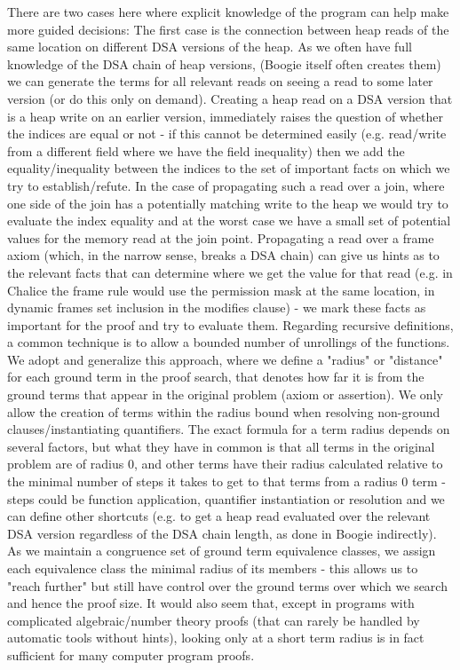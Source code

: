 		There are two cases here where explicit knowledge of the program can help make more guided decisions:
		The first case is the connection between heap reads of the same location on different DSA versions of the heap.
		As we often have full knowledge of the DSA chain of heap versions, (Boogie itself often creates them) we can generate the terms for all relevant reads on seeing a read to some later version (or do this only on demand).
		Creating a heap read on a DSA version that is a heap write on an earlier version, immediately raises the question of whether the indices are equal or not - if this cannot be determined easily (e.g. read/write from a different field where we have the field inequality) then we add the equality/inequality between the indices to the set of important facts on which we try to establish/refute.
		In the case of propagating such a read over a join, where one side of the join has a potentially matching write to the heap we would try to evaluate the index equality and at the worst case we have a small set of potential values for the memory read at the join point.
		Propagating a read over a frame axiom (which, in the narrow sense, breaks a DSA chain) can give us hints as to the relevant facts that can determine where we get the value for that read (e.g. in Chalice the frame rule would use the permission mask at the same location, in dynamic frames set inclusion in the modifies clause) - we mark these facts as important for the proof and try to evaluate them.
		Regarding recursive definitions, a common technique is to allow a bounded number of unrollings of the functions.
		We adopt and generalize this approach, where we define a "radius" or "distance" for each ground term in the proof search, that denotes how far it is from the ground terms that appear in the original problem (axiom or assertion). We only allow the creation of terms within the radius bound when resolving non-ground clauses/instantiating quantifiers.
		The exact formula for a term radius depends on several factors, but what they have in common is that all terms in the original problem are of radius 0, and other terms have their radius calculated relative to the minimal number of steps it takes to get to that terms from a radius 0 term - steps could be function application, quantifier instantiation or resolution and we can define other shortcuts (e.g. to get a heap read evaluated over the relevant DSA version regardless of the DSA chain length, as done in Boogie indirectly).
		As we maintain a congruence set of ground term equivalence classes, we assign each equivalence class the minimal radius of its members - this allows us to "reach further" but still have control over the ground terms over which we search and hence the proof size.
		It would also seem that, except in programs with complicated algebraic/number theory proofs (that can rarely be handled by automatic tools without hints), looking only at a short term radius is in fact sufficient for many computer program proofs.
		

		